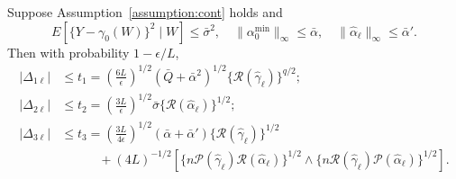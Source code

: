 \begin{proposition}\label{prop:resid_alt}
Suppose Assumption~\ref{assumption:cont} holds and
$$
E[\{Y-\gamma_0(W)\}^2 \mid W ]\leq \bar{\sigma}^2,\quad \|\alpha_0^{\min}\|_{\infty}\leq\bar{\alpha},\quad \|\hat{\alpha}_{\ell}\|_{\infty}\leq\bar{\alpha}'.
$$
Then with probability $1-\epsilon/L$,
\begin{align*}
    |\Delta_{1\ell}|&\leq t_1=\left(\frac{6L}{\epsilon}\right)^{1/2}(\bar{Q}+\bar{\alpha}^2)^{1/2}\{\mathcal{R}(\hat{\gamma}_{\ell})\}^{q/2}; \\
    |\Delta_{2\ell}|&\leq t_2= \left(\frac{3L}{\epsilon}\right)^{1/2}\bar{\sigma}\{\mathcal{R}(\hat{\alpha}_{\ell})\}^{1/2};\\
    |\Delta_{3\ell}|&\leq t_3= \left(\frac{3L}{4\epsilon}\right)^{1/2}(\bar{\alpha}+\bar{\alpha}')\{\mathcal{R}(\hat{\gamma}_{\ell})\}^{1/2}\\
    &\quad \quad \quad +(4L)^{-1/2} [\{n\mathcal{P}(\hat{\gamma}_{\ell})\mathcal{R}(\hat{\alpha}_{\ell})\}^{1/2} \wedge \{n\mathcal{R}(\hat{\gamma}_{\ell})\mathcal{P}(\hat{\alpha}_{\ell})\}^{1/2}].
\end{align*}
\end{proposition}

